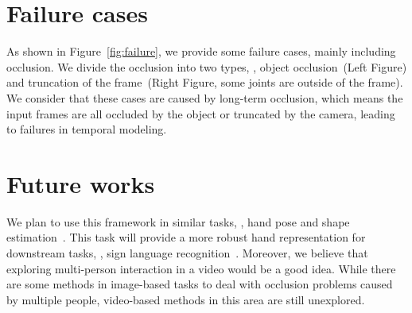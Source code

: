 \documentclass[10pt,twocolumn,letterpaper]{article}
\begin{document}
\section{Failure cases}

As shown in Figure~\ref{fig:failure}, we provide some failure cases, mainly including occlusion. We divide the occlusion into two types, \ie, object occlusion~(Left Figure) and truncation of the frame~(Right Figure, some joints are outside of the frame). 
We consider that these cases are caused by long-term occlusion, which means the input frames are all occluded by the object or truncated by the camera, leading to failures in temporal modeling. 


\section{Future works}
We plan to use this framework in similar tasks, \ie, hand pose and shape estimation~\cite{JavierRomero2017EmbodiedHM, zimmermann2019freihand}. This task will provide a more robust hand representation for downstream tasks, \eg, sign language recognition~\cite{XiaolongShen2022StepNetSP}.
Moreover, we believe that exploring multi-person interaction in a video would be a good idea. While there are some methods in image-based tasks to deal with occlusion problems caused by multiple people, video-based methods in this area are still unexplored.




\clearpage{}
	
\end{document}

